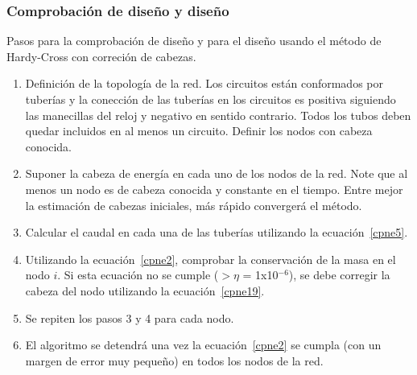 \documentclass[11pt, oneside]{article}
\begin{document}
\subsubsection*{Comprobaci\'on de dise\~no y dise\~no}
Pasos para la comprobaci\'on de dise\~no y para el dise\~no usando el m\'etodo de Hardy-Cross con correci\'on de cabezas.
\begin{enumerate}
\item Definici\'on de la topolog\'ia de la red. Los circuitos est\'an conformados por tuber\'ias y la conecci\'on de las tuber\'ias en los circuitos es positiva siguiendo las manecillas del reloj y negativo en sentido contrario. Todos los tubos deben quedar incluidos en al menos un circuito. Definir los nodos con cabeza conocida. 
\item Suponer la cabeza de energ\'ia en cada uno de los nodos de la red. Note que al menos un nodo es de cabeza conocida y constante en el tiempo. Entre mejor la estimaci\'on de cabezas iniciales, m\'as r\'apido converger\'a el m\'etodo.
\item Calcular el caudal en cada una de las tuber\'ias utilizando la ecuaci\'on~\ref{cpne5}.
\item Utilizando la ecuaci\'on~\ref{cpne2}, comprobar la conservaci\'on de la masa en el nodo $i$. Si esta ecuaci\'on no se cumple ($> \eta$ = 1x10$^{-6}$), se debe corregir la cabeza del nodo utilizando la ecuaci\'on~\ref{cpne19}.
\item Se repiten los pasos 3 y 4 para cada nodo.
\item El algoritmo se detendr\'a una vez la ecuaci\'on~\ref{cpne2} se cumpla (con un margen de error muy peque\~no) en todos los nodos de la red. 
\end{enumerate}
\end{document}
